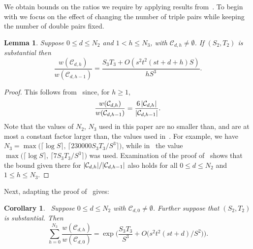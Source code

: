 \documentclass[12pt]{article}
\newtheorem{lemma}[theorem]{Lemma}
\newtheorem{corollary}[theorem]{Corollary}
\numberwithin{equation}{section}
\def\C{{\mathcal{C}}}
\def\({\bigl(}   \def\){\bigr)}
\def\ac#1{\card{\C_{#1}}}
\begin{document}
We obtain bounds on the ratios we require by applying
results from~\cite{GMW}.  To begin with we focus
on the effect of changing the number of triple pairs while
keeping the number of double pairs fixed.

\begin{lemma}
\label{tswitch}
Suppose $0\le d\le N_2$ and $1<h\le N_3$, with $\C_{d,h}\neq \emptyset$.
If $(S_2,T_2)$ is substantial then
\[ \frac{w(\C_{d,h})}{w(\C_{d,h-1})}
   = \frac{S_3T_3 + O(s^2t^2(st+d+h)S)}{hS^3}.\]
\end{lemma}

\begin{proof}
This follows from~\cite[Lemma 4.6]{GMW} since, for $h\geq 1$,
\[ \frac{w(\C_{d,h})}{w(\C_{d,h-1})} =\frac{6\,\ac{d,h}}{\ac{d,h-1}}.
\]
Note that the values of $N_2$, $N_3$ used in this paper are no smaller than,
and are at most a constant
factor larger than, the values used in~\cite{GMW}.  For example,
we have $N_3 = \max\(\lceil \log S\rceil,\, \lceil 230000 S_3 T_3/S^3\rceil\)$,
while in~\cite{GMW} the value $\max\( \lceil \log S\rceil,\,
          \lceil 7 S_3 T_3/S^3\rceil\)$ was used.
Examination of the proof of~\cite[Lemma 4.6]{GMW} shows that the
bound given there for 
$\ac{d,h}/\ac{d,h-1}$
also holds for all $0\leq d\leq N_2$ and $1\leq h\leq N_3$. 
\end{proof}

\bigskip

Next, adapting the proof of~\cite[Corollary 4.7]{GMW} gives:

\begin{corollary}
\label{hsum}
\ Suppose $0\le d\le N_2$ with $\C_{d,0}\neq \emptyset$.
Further suppose that
$(S_2,T_2)$ is substantial.  Then
\[
\sum_{h=0}^{N_3} \frac{w(\C_{d,h})}{w(\C_{d,0})}
   = \exp\biggl( \frac{S_3T_3}{S^3}
            + O\(s^2t^2(st+d)/S^2\)\biggr).
\]
\end{corollary}
\end{document}
